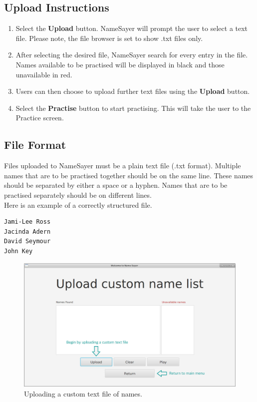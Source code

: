 \documentclass{article}
\begin{document}
\subsection{Upload Instructions}

\begin{enumerate}
	\item Select the \textbf{Upload} button. NameSayer will prompt the user to
	select a text file. Please note, the file browser is set to show .txt files
	only.

	\item After selecting the desired file, NameSayer search for every entry in
	the file. Names available to be practised will be displayed in black and
	those unavailable in red.

	\item Users can then choose to upload further text files using the
	\textbf{Upload} button.

	\item Select the \textbf{Practise} button to start practising. This will
	take the user to the Practice screen.

\end{enumerate}

\subsection{File Format}
Files uploaded to NameSayer must be a plain text file (.txt format).  Multiple
names that are to be practised together should be on the  same line. These names
should be separated by either a space or a hyphen. Names that are to be
practised separately should be on different lines. \\

Here is an example of a correctly structured file.
\begin{verbatim}
Jami-Lee Ross
Jacinda Adern
David Seymour
John Key
\end{verbatim}

\begin{figure}[H]
	\includegraphics[width=\textwidth]{images/5_upload_empty.jpg}
	\caption{Uploading a custom text file of names.}
	\label{uploadempty}
\end{figure}
\end{document}
